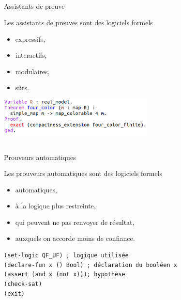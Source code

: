 \documentclass{beamer}
\begin{document}
\subsection{}
\begin{frame}{Assistants de preuve}

Les assistants de preuves sont des logiciels formels 
\begin{itemize}
    \item expressifs,
    \item interactifs,
    \item modulaires,
    \item sûrs.
\end{itemize}

\hspace{1cm}

\includegraphics[height=2cm]{fourcolor.png}


\end{frame}


\subsection{}
\begin{frame}{Prouveurs automatiques}

Les prouveurs automatiques sont des logiciels formels
\begin{itemize}
    \item automatiques,
    \item à la logique plus restreinte,
    \item qui peuvent ne pas renvoyer de résultat,
    \item auxquels on accorde moins de confiance.
\end{itemize}

\hspace{1cm}

\texttt{(set-logic QF\_UF) \hfill ; logique utilisée}\\
\texttt{(declare-fun x () Bool) \hfill ; déclaration du booléen x}\\
\texttt{(assert (and x (not x)))\hfill ; hypothèse }\\
\texttt{(check-sat)}\\
\texttt{(exit)}
\end{frame}
\end{document}

